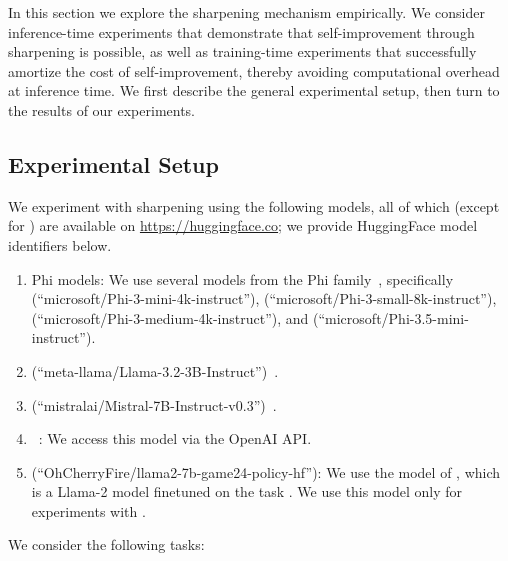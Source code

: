 
 
  In this section we explore the sharpening mechanism empirically.
  We consider inference-time experiments that demonstrate that self-improvement through sharpening is possible, as well as training-time experiments that successfully amortize the cost of self-improvement, thereby avoiding computational overhead at inference time.  We first describe the general experimental setup, then turn to the results of our experiments.

\subsection{Experimental Setup}

We experiment with sharpening using the following models, all of which (except for \gptthree) are available on \url{https://huggingface.co}; we provide HuggingFace model identifiers below.
\begin{enumerate}
\item Phi models: We use several models from the Phi family~\citep{abdin2024phi}, specifically \phithreemini (``microsoft/Phi-3-mini-4k-instruct''), \phithreesmall (``microsoft/Phi-3-small-8k-instruct''), \phithreemedium (``microsoft/Phi-3-medium-4k-instruct''), and \phithreefivemini (``microsoft/Phi-3.5-mini-instruct''). 
\item \llamathree (``meta-llama/Llama-3.2-3B-Instruct'')~\citep{dubey2024llama}.
\item \mistral (``mistralai/Mistral-7B-Instruct-v0.3'')~\citep{jiang2023mistral}.
\item \gptthree~\citep{brown2020language}: We access this model via the OpenAI API.
\item \llamagame (``OhCherryFire/llama2-7b-game24-policy-hf''): We use the model of \iftoggle{workshop}{\cite{wan2024alphazero}}{\citet{wan2024alphazero}}, which is a Llama-2 model finetuned on the \gametwentyfour task \citep{yao2024tree}. We use this model only for experiments with \gametwentyfour. 
\end{enumerate}

We consider the following tasks:

